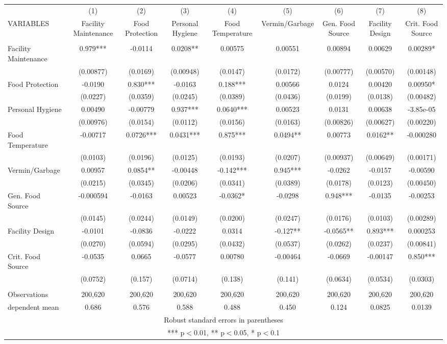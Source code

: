 \begin{tabular}{lcccccccc} \hline
 & (1) & (2) & (3) & (4) & (5) & (6) & (7) & (8) \\
VARIABLES & Facility Maintenance & Food Protection & Personal Hygiene & Food Temperature & Vermin/Garbage & Gen. Food Source & Facility Design & Crit. Food Source \\ \hline
 &  &  &  &  &  &  &  &  \\
Facility Maintenance & 0.979*** & -0.0114 & 0.0208** & 0.00575 & 0.00551 & 0.00894 & 0.00629 & 0.00289* \\
 & (0.00877) & (0.0169) & (0.00948) & (0.0147) & (0.0172) & (0.00777) & (0.00570) & (0.00148) \\
Food Protection & -0.0190 & 0.830*** & -0.0163 & 0.188*** & 0.00566 & 0.0124 & 0.00420 & 0.00950* \\
 & (0.0227) & (0.0359) & (0.0245) & (0.0389) & (0.0436) & (0.0199) & (0.0138) & (0.00482) \\
Personal Hygiene & 0.00490 & -0.00779 & 0.937*** & 0.0640*** & 0.00523 & 0.0131 & 0.00638 & -3.85e-05 \\
 & (0.00976) & (0.0154) & (0.0112) & (0.0156) & (0.0163) & (0.00826) & (0.00627) & (0.00220) \\
Food Temperature & -0.00717 & 0.0726*** & 0.0431*** & 0.875*** & 0.0494** & 0.00773 & 0.0162** & -0.000280 \\
 & (0.0103) & (0.0196) & (0.0125) & (0.0193) & (0.0207) & (0.00937) & (0.00649) & (0.00171) \\
Vermin/Garbage & 0.00957 & 0.0854** & -0.00448 & -0.142*** & 0.945*** & -0.0262 & -0.0157 & -0.00590 \\
 & (0.0215) & (0.0345) & (0.0206) & (0.0341) & (0.0389) & (0.0178) & (0.0123) & (0.00450) \\
Gen. Food Source & -0.000594 & -0.0163 & 0.00523 & -0.0362* & -0.0298 & 0.948*** & -0.0135 & -0.00253 \\
 & (0.0145) & (0.0244) & (0.0149) & (0.0200) & (0.0247) & (0.0176) & (0.0103) & (0.00289) \\
Facility Design & -0.0101 & -0.0836 & -0.0222 & 0.0314 & -0.127** & -0.0565** & 0.893*** & 0.000253 \\
 & (0.0270) & (0.0594) & (0.0295) & (0.0432) & (0.0537) & (0.0262) & (0.0237) & (0.00841) \\
Crit. Food Source & -0.0535 & 0.0665 & -0.0577 & 0.00780 & -0.00464 & -0.0669 & -0.00147 & 0.850*** \\
 & (0.0752) & (0.157) & (0.0714) & (0.138) & (0.141) & (0.0634) & (0.0534) & (0.0303) \\
 &  &  &  &  &  &  &  &  \\
Observations & 200,620 & 200,620 & 200,620 & 200,620 & 200,620 & 200,620 & 200,620 & 200,620 \\
 dependent mean & 0.686 & 0.576 & 0.588 & 0.488 & 0.450 & 0.124 & 0.0825 & 0.0139 \\ \hline
\multicolumn{9}{c}{ Robust standard errors in parentheses} \\
\multicolumn{9}{c}{ *** p$<$0.01, ** p$<$0.05, * p$<$0.1} \\
\end{tabular}
